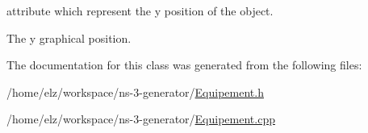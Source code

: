 attribute which represent the y position of the object. 

The y graphical position. 

The documentation for this class was generated from the following files:\begin{CompactItemize}
\item 
/home/elz/workspace/ns-3-generator/\hyperlink{_equipement_8h}{Equipement.h}\item 
/home/elz/workspace/ns-3-generator/\hyperlink{_equipement_8cpp}{Equipement.cpp}\end{CompactItemize}
